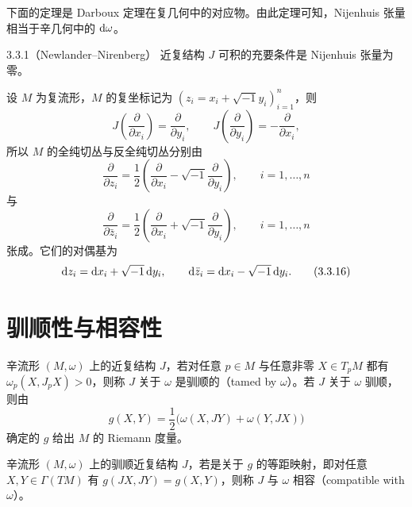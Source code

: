 下面的定理是 Darboux 定理在复几何中的对应物。由此定理可知，Nijenhuis 张量相当于辛几何中的 $\mathrm{d}\omega$。

\begin{theorem}{3.3.1（Newlander--Nirenberg）}
  近复结构 $J$ 可积的充要条件是 Nijenhuis 张量为零。
\end{theorem}


设 $M$ 为复流形，$M$ 的复坐标记为 $(z_i=x_i+\sqrt{-1}y_i)_{i=1}^{n}$，则
\begin{equation}
  J\left(\frac{\partial}{\partial x_i}\right)=\frac{\partial}{\partial y_i},\qquad
  J\left(\frac{\partial}{\partial y_i}\right)=-\frac{\partial}{\partial x_i},
  \tag{3.3.13}
\end{equation}
所以 $M$ 的全纯切丛与反全纯切丛分别由
\begin{equation}
  \frac{\partial}{\partial z_i}=\frac{1}{2}\left(\frac{\partial}{\partial x_i}-\sqrt{-1}\frac{\partial}{\partial y_i}\right),
  \qquad i=1,\dots,n
  \tag{3.3.14}
\end{equation}
与
\begin{equation}
  \frac{\partial}{\partial \bar z_i}=\frac{1}{2}\left(\frac{\partial}{\partial x_i}+\sqrt{-1}\frac{\partial}{\partial y_i}\right),
  \qquad i=1,\dots,n
  \tag{3.3.15}
\end{equation}
张成。它们的对偶基为
\begin{equation}
  \mathrm{d} z_i=\mathrm{d} x_i+\sqrt{-1}\,\mathrm{d} y_i,\qquad
  \mathrm{d}\bar z_i=\mathrm{d} x_i-\sqrt{-1}\,\mathrm{d} y_i.
  \tag{3.3.16}
\end{equation}

\section{驯顺性与相容性}

辛流形 $(M,\omega)$ 上的近复结构 $J$，若对任意 $p\in M$ 与任意非零 $X\in T_pM$ 都有 $\omega_p(X,J_pX)>0$，则称 $J$ 关于 $\omega$ 是驯顺的（tamed by $\omega$）。若 $J$ 关于 $\omega$ 驯顺，则由
\begin{equation}
  g(X,Y)=\frac{1}{2}\bigl(\omega(X,JY)+\omega(Y,JX)\bigr)
  \tag{3.4.1}
\end{equation}
确定的 $g$ 给出 $M$ 的 Riemann 度量。

辛流形 $(M,\omega)$ 上的驯顺近复结构 $J$，若是关于 $g$ 的等距映射，即对任意 $X,Y\in\Gamma(TM)$ 有 $g(JX,JY)=g(X,Y)$，则称 $J$ 与 $\omega$ 相容（compatible with $\omega$）。

